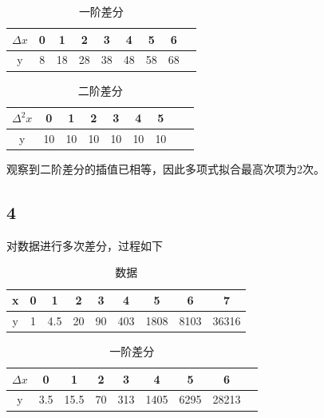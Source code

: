 \documentclass{article}
\begin{document}
\begin{table}[!h]
\begin{center}
\begin{tabular}{c|c c c c c c c c}
    $\Delta x$ & 0 & 1 & 2 & 3 & 4 & 5 & 6  \\
    \hline
    y & 8 & 18 & 28 & 38 & 48 & 58 & 68 \\
\end{tabular}
\caption{\label{demo-table}一阶差分}
\end{center}
\end{table}

\newpage

\begin{table}[!h]
\begin{center}
\begin{tabular}{c|c c c c c c c c}
    $\Delta^2 x$ & 0 & 1 & 2 & 3 & 4 & 5  \\
    \hline
    y & 10 & 10 & 10 & 10 & 10 & 10 \\
\end{tabular}
\caption{\label{demo-table}二阶差分}
\end{center}
\end{table}

观察到二阶差分的插值已相等，因此多项式拟合最高次项为2次。


\subsection{4}

对数据进行多次差分，过程如下

\begin{table}[!h]
\begin{center}
\begin{tabular}{c|c c c c c c c c}
    x & 0 & 1 & 2 & 3 & 4 & 5 & 6 & 7  \\
    \hline
    y & 1 & 4.5 & 20 & 90 & 403 & 1808 & 8103 & 36316 \\
\end{tabular}
\caption{\label{demo-table}数据}
\end{center}
\end{table}

\begin{table}[!h]
\begin{center}
\begin{tabular}{c|c c c c c c c c}
    $\Delta x$ & 0 & 1 & 2 & 3 & 4 & 5 & 6  \\
    \hline
    y & 3.5 & 15.5 & 70 & 313 & 1405 & 6295 & 28213 \\
\end{tabular}
\caption{\label{demo-table}一阶差分}
\end{center}
\end{table}
\end{document}

